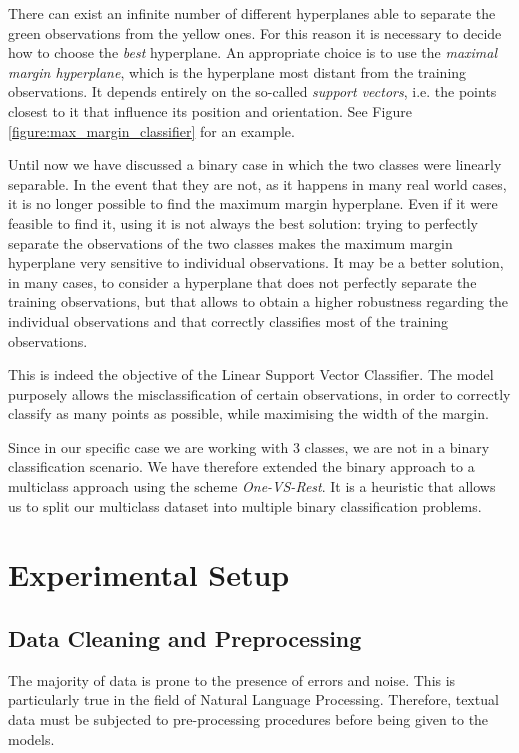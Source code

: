 \documentclass[letterpaper,11pt]{article}
\begin{document}
There can exist an infinite number of different hyperplanes able to separate the green observations from the yellow ones. For this reason it is necessary to decide how to choose the \textit{best} hyperplane. An appropriate choice is to use the \textit{maximal margin hyperplane}, which is the hyperplane most distant from the training observations. It depends entirely on the so-called \textit{support vectors}, i.e. the points closest to it that influence its position and orientation. See Figure \ref{figure:max_margin_classifier} for an example.

Until now we have discussed a binary case in which the two classes were linearly separable. In the event that they are not, as it happens in many real world cases, it is no longer possible to find the maximum margin hyperplane. Even if it were feasible to find it, using it is not always the best solution: trying to perfectly separate the observations of the two classes makes the maximum margin hyperplane very sensitive to individual observations. It may be a better solution, in many cases, to consider a hyperplane that does not perfectly separate the training observations, but that allows to obtain a higher robustness regarding the individual observations and that correctly classifies most of the training observations.

This is indeed the objective of the Linear Support Vector Classifier. The model purposely allows the misclassification of certain observations, in order to correctly classify as many points as possible, while maximising the width of the margin.

Since in our specific case we are working with 3 classes, we are not in a binary classification scenario. We have therefore extended the binary approach to a multiclass approach using the scheme \textit{One-VS-Rest}. It is a heuristic that allows us to split our multiclass dataset into multiple binary classification problems.


\newpage
\section{Experimental Setup}

\subsection{Data Cleaning and Preprocessing}

The majority of data is prone to the presence of errors and noise. This is particularly true in the field of Natural Language Processing. Therefore, textual data must be subjected to pre-processing procedures before being given to the models. 
\end{document}
